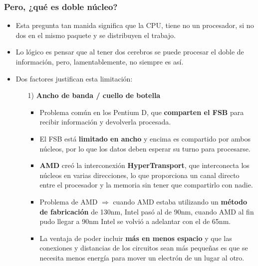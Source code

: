 \frame
{
\frametitle{Pero, ¿qué es doble núcleo?}
\begin{itemize}
\item Esta pregunta tan manida significa que la CPU, tiene no un procesador, si no dos en el mismo paquete y se distribuyen el trabajo.
\item Lo lógico es pensar que al tener dos cerebros se puede procesar el doble de información, pero, lamentablemente, no siempre es así.
\item Dos factores justifican esta limitación:

	\begin{itemize}
	\item[1)] \textbf{Ancho de banda / cuello de botella}
		\begin{itemize}
		\item Problema común en los Pentium D, que \textbf{comparten el FSB} para recibir información y devolverla procesada.
		\item El FSB está \textbf{limitado en ancho} y encima es compartido por ambos núcleos, por lo que los datos deben esperar su turno para procesarse.
		\item \textbf{AMD} creó la interconexión \textbf{HyperTransport}, que interconecta los núcleos en varias direcciones, lo que proporciona un canal directo entre el procesador y la memoria sin tener que compartirlo con nadie. 
		\item Problema de AMD $\Rightarrow$ cuando AMD estaba utilizando un \textbf{método de fabricación} de 130nm, Intel pasó al de 90nm, cuando AMD al fin pudo llegar a 90nm Intel se volvió a adelantar con el de 65nm.
		\item La ventaja de poder incluir \textbf{más en menos espacio} y que las conexiones y distancias de los circuitos sean más pequeñas es que se necesita menos energía para mover un electrón de un lugar al otro.
		\end{itemize}
	\end{itemize}
\end{itemize}
}

